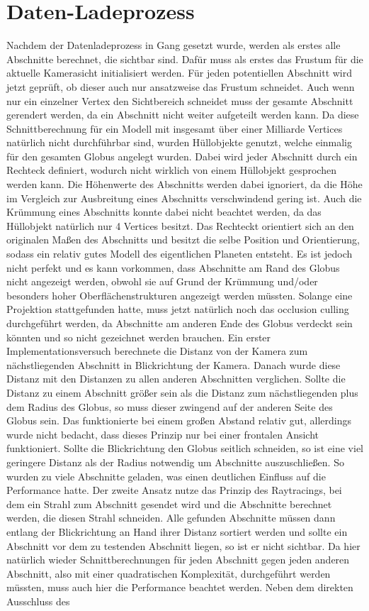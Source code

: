 \section{Daten-Ladeprozess}\label{dataLoading}
Nachdem der Datenladeprozess in Gang gesetzt wurde, werden als erstes alle Abschnitte berechnet, die sichtbar sind. Dafür muss als erstes das Frustum für die aktuelle Kamerasicht initialisiert werden. Für jeden potentiellen Abschnitt wird jetzt geprüft, ob dieser auch nur ansatzweise das Frustum schneidet. Auch wenn nur ein einzelner Vertex den Sichtbereich schneidet muss der gesamte Abschnitt gerendert werden, da ein Abschnitt nicht weiter aufgeteilt werden kann. Da diese Schnittberechnung für ein Modell mit insgesamt über einer Milliarde Vertices natürlich nicht durchführbar sind, wurden Hüllobjekte genutzt, welche einmalig für den gesamten Globus angelegt wurden. Dabei wird jeder Abschnitt durch ein Rechteck definiert, wodurch nicht wirklich von einem Hüllobjekt gesprochen werden kann. Die Höhenwerte des Abschnitts werden dabei ignoriert, da die Höhe im Vergleich zur Ausbreitung eines Abschnitts verschwindend gering ist. Auch die Krümmung eines Abschnitts konnte dabei nicht beachtet werden, da das Hüllobjekt natürlich nur 4 Vertices besitzt. Das Rechteckt orientiert sich an den originalen Maßen des Abschnitts und besitzt die selbe Position und Orientierung, sodass ein relativ gutes Modell des eigentlichen Planeten entsteht. Es ist jedoch nicht perfekt und es kann vorkommen, dass Abschnitte am Rand des Globus nicht angezeigt werden, obwohl sie auf Grund der Krümmung und/oder besonders hoher Oberflächenstrukturen angezeigt werden müssten. Solange eine Projektion stattgefunden hatte, muss jetzt natürlich noch das occlusion culling durchgeführt werden, da Abschnitte am anderen Ende des Globus verdeckt sein könnten und so nicht gezeichnet werden brauchen. Ein erster Implementationsversuch berechnete die Distanz von der Kamera zum nächstliegenden Abschnitt in Blickrichtung der Kamera. Danach wurde diese Distanz mit den Distanzen zu allen anderen Abschnitten verglichen. Sollte die Distanz zu einem Abschnitt größer sein als die Distanz zum nächstliegenden plus dem Radius des Globus, so muss dieser zwingend auf der anderen Seite des Globus sein. Das funktionierte bei einem großen Abstand relativ gut, allerdings wurde nicht bedacht, dass dieses Prinzip nur bei einer frontalen Ansicht funktioniert. Sollte die Blickrichtung den Globus seitlich schneiden, so ist eine viel geringere Distanz als der Radius notwendig um Abschnitte auszuschließen. So wurden zu viele Abschnitte geladen, was einen deutlichen Einfluss auf die Performance hatte. Der zweite Ansatz nutze das Prinzip des Raytracings, bei dem ein Strahl zum Abschnitt gesendet wird und die Abschnitte berechnet werden, die diesen Strahl schneiden. Alle gefunden Abschnitte müssen dann entlang der Blickrichtung an Hand ihrer Distanz sortiert werden und sollte ein Abschnitt vor dem zu testenden Abschnitt liegen, so ist er nicht sichtbar. Da hier natürlich wieder Schnittberechnungen für jeden Abschnitt gegen jeden anderen Abschnitt, also mit einer quadratischen Komplexität, durchgeführt werden müssten, muss auch hier die Performance beachtet werden. Neben dem direkten Ausschluss des 